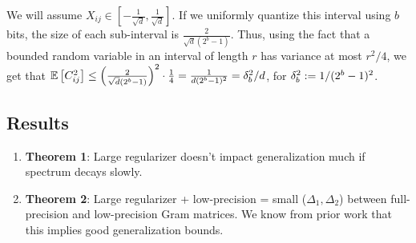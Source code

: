 We will assume $X_{ij} \in [-\frac{1}{\sqrt{d}},\frac{1}{\sqrt{d}}]$.  If we uniformly quantize this interval using $b$ bits, the size of each sub-interval is $\frac{2}{\sqrt{d}(2^b-1)}$.  Thus, using the fact that a bounded random variable in an interval of length $r$ has variance at most $r^2/4$, we get that $\expect{}{C_{ij}^2} \leq \Big(\frac{2}{\sqrt{d}(2^b-1)}\Big)^2\cdot \frac{1}{4} = \frac{1}{d(2^b-1)^2} = \delta_b^2/d$, for $\delta_b^2 \defeq 1/(2^b-1)^2$.

 
%


\subsection{Results}
\begin{enumerate}
	\item \textbf{Theorem 1}: Large regularizer doesn't impact generalization much if spectrum decays slowly.
	\item \textbf{Theorem 2}: Large regularizer + low-precision = small ($\Delta_1,\Delta_2$) between full-precision and low-precision Gram matrices.  We know from prior work that this implies good generalization bounds.
\end{enumerate}


